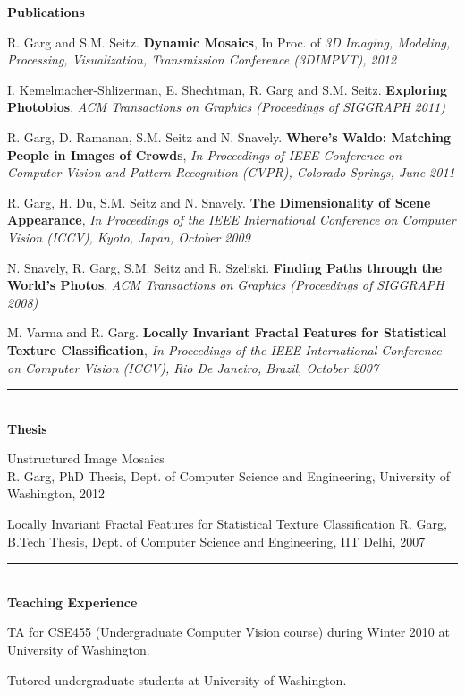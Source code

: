 \documentclass[10pt]{article}
\newenvironment{itemize*}%
  {\begin{itemize}%
    \setlength{\itemsep}{0pt}%
    \setlength{\parskip}{0pt}%
	}
  {\end{itemize}}
\begin{document}
{\large \textbf{Publications}}
\begin{itemize*}
\item R. Garg and S.M. Seitz. \textbf{Dynamic Mosaics}, In Proc. of \emph{3D Imaging, Modeling, Processing, Visualization, Transmission Conference (3DIMPVT), 2012}
\item I. Kemelmacher-Shlizerman, E. Shechtman, R. Garg and S.M. Seitz. \textbf{Exploring Photobios}, \emph{ACM Transactions on Graphics (Proceedings of SIGGRAPH 2011)}
\item R. Garg, D. Ramanan, S.M. Seitz and N. Snavely. \textbf{Where's Waldo: Matching People in Images of Crowds}, \emph{In Proceedings of IEEE Conference on Computer Vision and Pattern Recognition (CVPR), Colorado Springs, June 2011}
\item R. Garg, H. Du, S.M. Seitz and N. Snavely. \textbf{The Dimensionality of Scene Appearance}, \emph{In Proceedings of the IEEE International Conference on Computer Vision (ICCV), Kyoto, Japan, October 2009}
\item N. Snavely, R. Garg, S.M. Seitz and R. Szeliski. \textbf{Finding Paths through the World's Photos}, \emph{ACM Transactions on Graphics (Proceedings of SIGGRAPH 2008)}
\item M. Varma and R. Garg. \textbf{Locally Invariant Fractal Features for Statistical Texture Classification}, \emph{In Proceedings of the IEEE International Conference on Computer Vision (ICCV), Rio De Janeiro, Brazil, October 2007} 
\end{itemize*}
\rule{6.5in}{2pt}
\\
\vspace{0.10in}
{\large \textbf{Thesis}}
\begin{itemize*}
\item Unstructured Image Mosaics\\
R. Garg, PhD Thesis, Dept. of Computer Science and Engineering, University of Washington, 2012
\end{itemize*}
\begin{itemize*}
\item Locally Invariant Fractal Features for Statistical Texture Classification 
R. Garg, B.Tech Thesis, Dept. of Computer Science and Engineering, IIT Delhi, 2007
\end{itemize*}
\rule{6.5in}{2pt}
\\
\vspace{0.10in}
{\large \textbf{Teaching Experience}}
\begin{itemize*}
\item TA for CSE455 (Undergraduate Computer Vision course) during Winter 2010 at University of Washington.
\item Tutored undergraduate students at University of Washington.
\end{itemize*}
\end{document}
